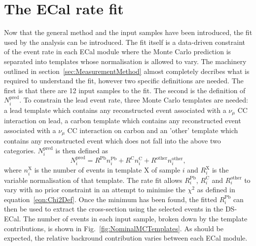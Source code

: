 \section{The ECal rate fit}
\label{sec:ECalRateFit}
Now that the general method and the input samples have been introduced, the fit used by the analysis can be introduced.  The fit itself is a data-driven constraint of the event rate in each ECal module where the Monte Carlo prediction is separated into templates whose normalisation is allowed to vary.  The machinery outlined in section~\ref{sec:MeasurementMethod} almost completely decribes what is required to understand the fit, however two specific definitions are needed.  The first is that there are 12 input samples to the fit.  The second is the definition of $N^{\textrm{pred}}_i$.  To constrain the lead event rate, three Monte Carlo templates are needed: a lead template which contains any reconstructed event associated with a $\nu_\mu$ CC interaction on lead, a carbon template which contains any reconstructed event associated with a $\nu_\mu$ CC interaction on carbon and an 'other' template which contains any reconstructed event which does not fall into the above two categories.  $N^{\textrm{pred}}_i$ is then defined as 
\begin{equation}
  N^{\textrm{pred}}_i = R^{\textrm{Pb}}n^{\textrm{Pb}}_i + R^{\textrm{C}}n^{\textrm{C}}_i + R^{\textrm{other}}n^{\textrm{other}}_i,
  \label{eqn:ECalFitPredDef}
\end{equation}
where $n^{\textrm{X}}_i$ is the number of events in template X of sample $i$ and $R^{\textrm{X}}_i$ is the variable normalisation of that template.
\newline
\newline
The rate fit allows $R^{\textrm{Pb}}_i$, $R^{\textrm{C}}_i$ and $R^{\textrm{other}}_i$ to vary with no prior constraint in an attempt to minimise the $\chi^{2}$ as defined in equation~\ref{eqn:Chi2Def}.  Once the minimum has been found, the fitted $R^{\textrm{Pb}}_i$ can then be used to extract the cross-section using the selected events in the DS-ECal.  
\newline
\newline
The number of events in each input sample, broken down by the template contributions, is shown in Fig.~\ref{fig:NominalMCTemplates}.  As should be expected, the relative backround contribution varies between each ECal module.
